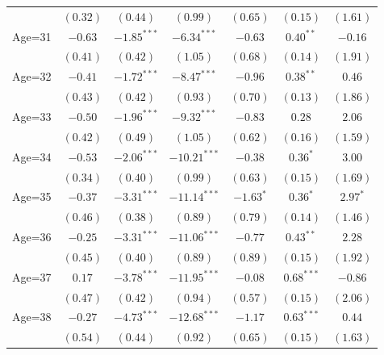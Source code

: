 \documentclass[fullpage]{paper}
\begin{document}
\begin{center}
\begin{longtable}{l c c c c c c }
            & $(0.32)$      & $(0.44)$       & $(0.99)$       & $(0.65)$       & $(0.15)$      & $(1.61)$      \\
Age=31      & $-0.63$       & $-1.85^{***}$  & $-6.34^{***}$  & $-0.63$        & $0.40^{**}$   & $-0.16$       \\
            & $(0.41)$      & $(0.42)$       & $(1.05)$       & $(0.68)$       & $(0.14)$      & $(1.91)$      \\
Age=32      & $-0.41$       & $-1.72^{***}$  & $-8.47^{***}$  & $-0.96$        & $0.38^{**}$   & $0.46$        \\
            & $(0.43)$      & $(0.42)$       & $(0.93)$       & $(0.70)$       & $(0.13)$      & $(1.86)$      \\
Age=33      & $-0.50$       & $-1.96^{***}$  & $-9.32^{***}$  & $-0.83$        & $0.28$        & $2.06$        \\
            & $(0.42)$      & $(0.49)$       & $(1.05)$       & $(0.62)$       & $(0.16)$      & $(1.59)$      \\
Age=34      & $-0.53$       & $-2.06^{***}$  & $-10.21^{***}$ & $-0.38$        & $0.36^{*}$    & $3.00$        \\
            & $(0.34)$      & $(0.40)$       & $(0.99)$       & $(0.63)$       & $(0.15)$      & $(1.69)$      \\
Age=35      & $-0.37$       & $-3.31^{***}$  & $-11.14^{***}$ & $-1.63^{*}$    & $0.36^{*}$    & $2.97^{*}$    \\
            & $(0.46)$      & $(0.38)$       & $(0.89)$       & $(0.79)$       & $(0.14)$      & $(1.46)$      \\
Age=36      & $-0.25$       & $-3.31^{***}$  & $-11.06^{***}$ & $-0.77$        & $0.43^{**}$   & $2.28$        \\
            & $(0.45)$      & $(0.40)$       & $(0.89)$       & $(0.89)$       & $(0.15)$      & $(1.92)$      \\
Age=37      & $0.17$        & $-3.78^{***}$  & $-11.95^{***}$ & $-0.08$        & $0.68^{***}$  & $-0.86$       \\
            & $(0.47)$      & $(0.42)$       & $(0.94)$       & $(0.57)$       & $(0.15)$      & $(2.06)$      \\
Age=38      & $-0.27$       & $-4.73^{***}$  & $-12.68^{***}$ & $-1.17$        & $0.63^{***}$  & $0.44$        \\
            & $(0.54)$      & $(0.44)$       & $(0.92)$       & $(0.65)$       & $(0.15)$      & $(1.63)$      \\

\end{longtable}
\end{center}
\end{document}

